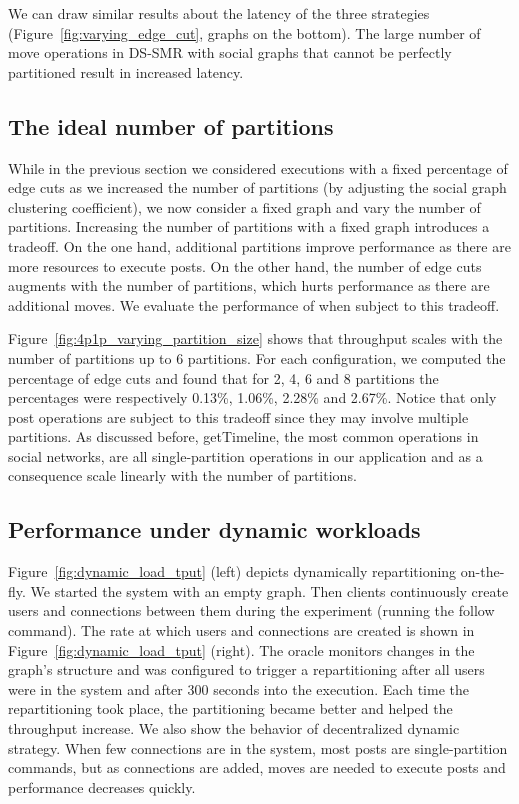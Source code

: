 We can draw similar results about the latency of the three strategies (Figure~\ref{fig:varying_edge_cut}, graphs on the bottom).
The large number of move operations in DS-SMR with social graphs that cannot be perfectly partitioned result in increased latency.


\subsection{The ideal number of partitions}
\label{sec:evaluation:results}

While in the previous section we considered executions with a fixed percentage of edge cuts as we increased the number of partitions (by adjusting the social graph clustering coefficient), we now consider a fixed graph and vary the number of partitions.
Increasing the number of partitions with a fixed graph introduces a tradeoff.
On the one hand, additional partitions improve performance as there are more resources to execute posts.
On the other hand, the number of edge cuts augments with the number of partitions, which hurts performance as there are additional moves.
We evaluate the performance of \dynastar when subject to this tradeoff. 

Figure~\ref{fig:4p1p_varying_partition_size} shows that throughput scales with the number of partitions up to 6 partitions.
For each configuration, we computed the percentage of edge cuts and found that for 2, 4, 6 and 8 partitions the percentages were respectively 
0.13\%, 1.06\%, 2.28\% and 2.67\%.
Notice that only post operations are subject to this tradeoff since they may involve multiple partitions.
As discussed before, getTimeline, the most common operations in social networks, are all single-partition operations in our application and as a consequence scale linearly with the number of partitions.


\subsection{Performance under dynamic workloads}

Figure~\ref{fig:dynamic_load_tput} (left) depicts dynamically repartitioning
on-the-fly.  We started the system with an empty graph. Then clients
continuously create users and connections between them during the experiment
(running the follow command).  
The rate at which users and connections are created is shown in Figure~\ref{fig:dynamic_load_tput} (right).
The oracle monitors changes in the
graph's structure and was configured to trigger a repartitioning after all users were in the system and after 300 seconds into the execution.
Each time the repartitioning took place, the partitioning became better and helped the throughput increase.
We also show the behavior of decentralized dynamic strategy.
When few connections are in the system, most posts are single-partition commands, but as connections are added, moves are needed to execute posts and performance decreases quickly.

